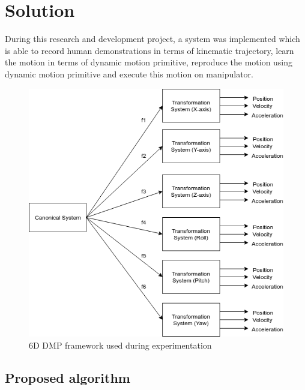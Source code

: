 
\chapter{Solution}


During this research and development project, a system was implemented which is able to record human demonstrations in terms of kinematic trajectory, learn the motion in terms of dynamic motion primitive, reproduce the motion using dynamic motion primitive and execute this motion on manipulator.     

\begin{figure}[H]
	\includegraphics[width=\textwidth]{images/DMP_6DOF.png}
	\caption{6D DMP framework used during experimentation}
	\label{fig:DMP_6DOF}
\end{figure}


\section{Proposed algorithm}

